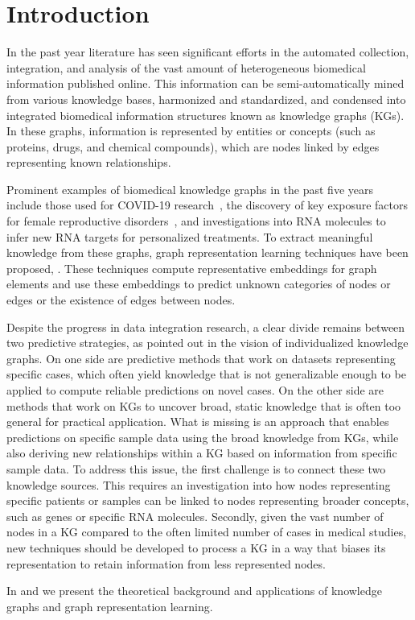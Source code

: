 \chapter{Introduction}
In the past year literature has seen significant efforts in the automated collection, integration, and analysis of the vast amount of heterogeneous biomedical information published online. This information can be semi-automatically mined from various knowledge bases, harmonized and standardized, and condensed into integrated biomedical information structures known as knowledge graphs (KGs). In these graphs, information is represented by entities or concepts (such as proteins, drugs, and chemical compounds), which are nodes linked by edges representing known relationships.

Prominent examples of biomedical knowledge graphs in the past five years include those used for COVID-19 research~\cite{ReeseJustinT.2021KAFt}, the discovery of key exposure factors for female reproductive disorders~\cite{ChanLaurenE2024Pnae}, and investigations into RNA molecules to infer new RNA targets for personalized treatments\cite{CavalleriEmanuele2024Aokg}. To extract meaningful knowledge from these graphs, graph representation learning techniques have been proposed\cite{Hamilton2020GraphRL}, \cite{li2022graphrepresentationlearningbiomedicine}. These techniques compute representative embeddings for graph elements and use these embeddings to predict unknown categories of nodes or edges or the existence of edges between nodes.

Despite the progress in data integration research, a clear divide remains between two predictive strategies, as pointed out in the vision of individualized knowledge graphs\cite{PingPeipei2017IKGA}. On one side are predictive methods that work on datasets representing specific cases, which often yield knowledge that is not generalizable enough to be applied to compute reliable predictions on novel cases. On the other side are methods that work on KGs to uncover broad, static knowledge that is often too general for practical application. What is missing is an approach that enables predictions on specific sample data using the broad knowledge from KGs, while also deriving new relationships within a KG based on information from specific sample data. To address this issue, the first challenge is to connect these two knowledge sources. This requires an investigation into how nodes representing specific patients or samples can be linked to nodes representing broader concepts, such as genes or specific RNA molecules. Secondly, given the vast number of nodes in a KG compared to the often limited number of cases in medical studies, new techniques should be developed to process a KG in a way that biases its representation to retain information from less represented nodes.

In  and  we present the theoretical background and applications of knowledge graphs and graph representation learning.